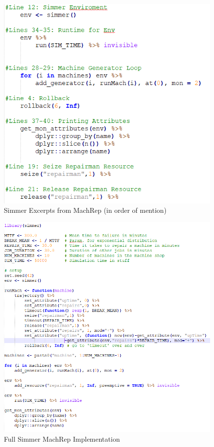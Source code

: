 \documentclass[a4paper, 11pt]{article} %
\begin{document}
\begin{figure}[H]
	\caption{Simmer Excerpts from MachRep (in order of mention)}
	\includegraphics{simmer1}
	\centering
\end{figure} \pagebreak

\begin{figure}[H]
	\centering
	\caption{Full Simmer MachRep Implementation}
	\includegraphics[width=16cm]{simmer2}
\end{figure} \pagebreak
\end{document}
